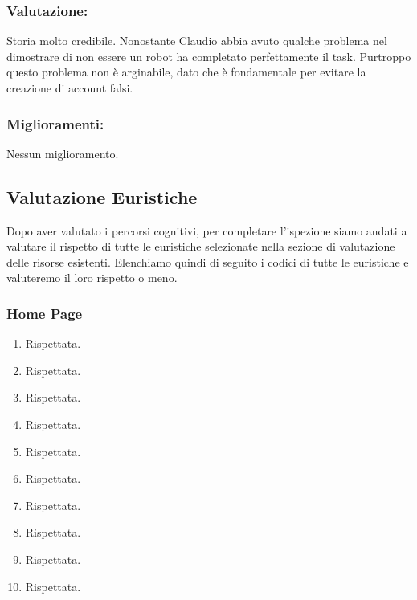 \documentclass[../Report.tex]{subfiles}
\begin{document}
    \subsubsection{Valutazione:}
    Storia molto credibile. Nonostante Claudio abbia avuto qualche problema nel dimostrare di non essere un robot ha completato perfettamente il task. Purtroppo questo problema non è arginabile, dato che è fondamentale per evitare la creazione di account falsi.
    \subsubsection{Miglioramenti:}
    Nessun miglioramento. 
    
    \subsection{Valutazione Euristiche}
    Dopo aver valutato i percorsi cognitivi, per completare l'ispezione siamo andati a valutare il rispetto di tutte le euristiche selezionate nella sezione di valutazione delle risorse esistenti. Elenchiamo quindi di seguito i codici di tutte le euristiche e valuteremo il loro rispetto o meno.
    \subsubsection{Home Page}
    \begin{enumerate}
        \item Rispettata.
        \item Rispettata.
        \item Rispettata.
        \item Rispettata.
        \item Rispettata.
        \item Rispettata.
        \item Rispettata.
        \item Rispettata.
        \item Rispettata.
        \item Rispettata.
    \end{enumerate}
\end{document}
